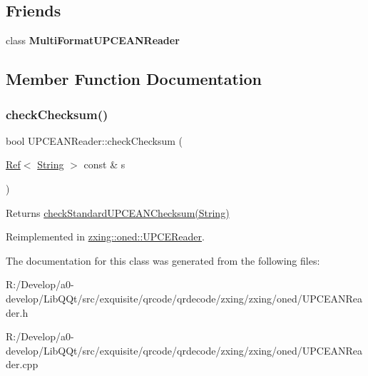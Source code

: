 \subsection*{Friends}
\begin{DoxyCompactItemize}
\item 
\mbox{\label{classzxing_1_1oned_1_1_u_p_c_e_a_n_reader_aaa4fa48c1c6d0e9ecd5327cdad7458f6}} 
class {\bfseries Multi\+Format\+U\+P\+C\+E\+A\+N\+Reader}
\end{DoxyCompactItemize}


\subsection{Member Function Documentation}
\mbox{\label{classzxing_1_1oned_1_1_u_p_c_e_a_n_reader_a8dab230e3a380491ddd88447bb583d80}} 
\subsubsection{\texorpdfstring{check\+Checksum()}{checkChecksum()}}
{\footnotesize\ttfamily bool U\+P\+C\+E\+A\+N\+Reader\+::check\+Checksum (\begin{DoxyParamCaption}\item[{\mbox{\hyperlink{classzxing_1_1_ref}{Ref}}$<$ \mbox{\hyperlink{classzxing_1_1_string}{String}} $>$ const \&}]{s }\end{DoxyParamCaption})\hspace{0.3cm}{\ttfamily [virtual]}}

\begin{DoxyReturn}{Returns}
\mbox{\hyperlink{}{check\+Standard\+U\+P\+C\+E\+A\+N\+Checksum(\+String)}} 
\end{DoxyReturn}


Reimplemented in \mbox{\hyperlink{classzxing_1_1oned_1_1_u_p_c_e_reader_abb30f05f10f7f87ab247780eafd5b50a}{zxing\+::oned\+::\+U\+P\+C\+E\+Reader}}.



The documentation for this class was generated from the following files\+:\begin{DoxyCompactItemize}
\item 
R\+:/\+Develop/a0-\/develop/\+Lib\+Q\+Qt/src/exquisite/qrcode/qrdecode/zxing/zxing/oned/U\+P\+C\+E\+A\+N\+Reader.\+h\item 
R\+:/\+Develop/a0-\/develop/\+Lib\+Q\+Qt/src/exquisite/qrcode/qrdecode/zxing/zxing/oned/U\+P\+C\+E\+A\+N\+Reader.\+cpp\end{DoxyCompactItemize}
